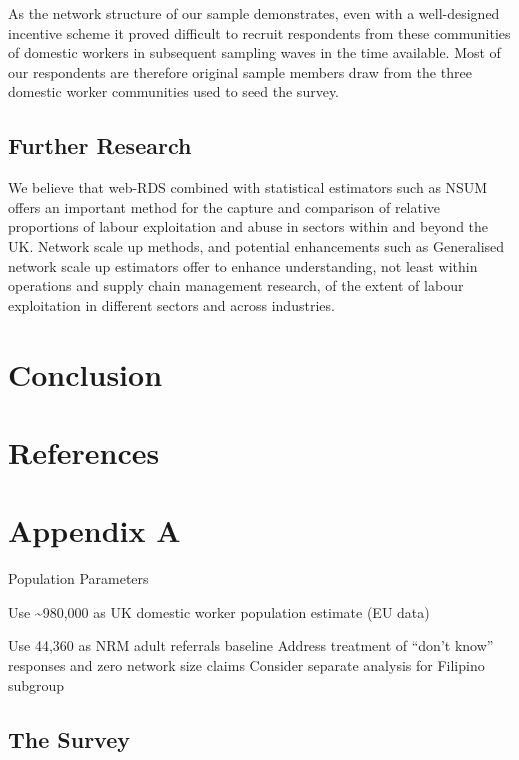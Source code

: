 \documentclass[
  12pt,
  letterpaper,
  DIV=11,
  numbers=noendperiod]{scrartcl}
\theoremstyle{plain}
\theoremstyle{definition}
\begin{document}
As the network structure of our sample demonstrates, even with a
well-designed incentive scheme it proved difficult to recruit
respondents from these communities of domestic workers in subsequent
sampling waves in the time available. Most of our respondents are
therefore original sample members draw from the three domestic worker
communities used to seed the survey.

\subsection{Further Research}\label{further-research}

We believe that web-RDS combined with statistical estimators such as
NSUM offers an important method for the capture and comparison of
relative proportions of labour exploitation and abuse in sectors within
and beyond the UK. Network scale up methods, and potential enhancements
such as Generalised network scale up estimators offer to enhance
understanding, not least within operations and supply chain management
research, of the extent of labour exploitation in different sectors and
across industries.

\section{Conclusion}\label{conclusion}

\newpage

\newpage

\section{References}\label{references}

\printbibliography[heading=none]

\newpage

\appendix

\section{Appendix A}\label{app-survey}

Population Parameters

Use \textasciitilde980,000 as UK domestic worker population estimate (EU
data)

Use 44,360 as NRM adult referrals baseline Address treatment of ``don't
know'' responses and zero network size claims Consider separate analysis
for Filipino subgroup

\subsection{The Survey}\label{the-survey}
\end{document}
